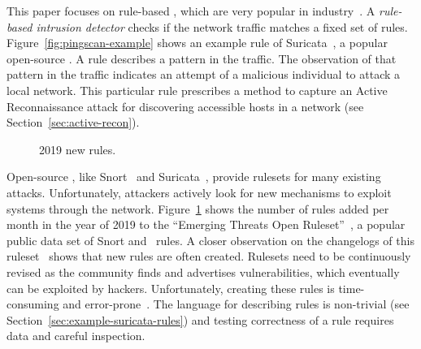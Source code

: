 \documentclass[conference]{IEEEtran}
\begin{document}
This paper focuses on rule-based \nids{}, which are very popular in
industry~\cite{proofpoint-etpro,snort-rule-subscriptions}. A
\emph{rule-based intrusion detector} checks if the network traffic matches a fixed
set of rules. Figure~\ref{fig:pingscan-example} shows an example rule
of Suricata~\cite{suricata}, a popular open-source \nids{}. A rule
describes a pattern in the traffic. The observation of that pattern in
the traffic indicates an attempt of a malicious individual
to attack a local network. This particular rule prescribes a method to
capture an Active Reconnaissance attack for discovering accessible
hosts in a network (see Section~\ref{sec:active-recon}).

\begin{figure}
    \vspace{-4ex}  
    \centering
    \vspace{-5ex}
    \caption{\label{fig:distribution-rules-per-month}2019 new rules.}
\end{figure}
Open-source \nids{}, like Snort~\cite{snort} and
Suricata~\cite{suricata}, provide rulesets for many existing
attacks. Unfortunately, attackers actively look for new mechanisms to
exploit systems through the
network. Figure~\ref{fig:distribution-rules-per-month} shows the
number of rules added per month in the year of 2019 to the ``Emerging
Threats Open Ruleset''~\cite{emerging-threats-open}, a popular public
data set of Snort and \suri\ rules. A closer observation on the changelogs of
this ruleset~\cite{emerging-threats-changelogs} shows that new rules
are often created.  Rulesets need to be continuously revised as the
community finds and advertises vulnerabilities, which eventually can
be exploited by hackers.  Unfortunately, creating these rules is
time-consuming and error-prone~\cite{vollmer-etal-cics2011,alparslan-blog-suri}. The language for
describing rules is non-trivial (see
Section~\ref{sec:example-suricata-rules}) and testing correctness of a
rule requires data and careful inspection.
\end{document}
